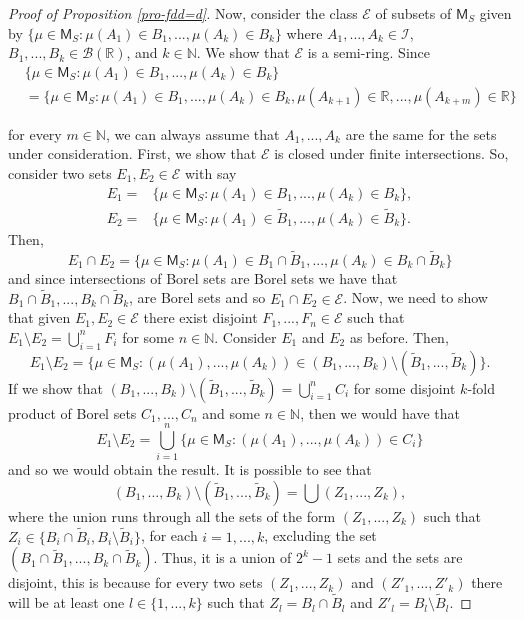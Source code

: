 \documentclass{article}
\theoremstyle{plain}
\theoremstyle{remark}
\begin{document}
\begin{proof}[Proof of Proposition \ref{pro-fdd=d}]
	Now, consider the class $\mathcal{E}$ of subsets of $\mathsf{M}_S$ given by $\{\mu\in\mathsf{M}_S:\mu(A_1)\in B_1,...,\mu(A_k)\in B_k\}$ where $A_1,...,A_k\in\mathcal{I}$, $B_1,...,B_k\in\mathcal{B}(\mathbb{R})$, and $k\in\mathbb{N}$. We show that $\mathcal{E}$ is a semi-ring. Since 
	\begin{align*}
		&\{\mu\in\mathsf{M}_S:\mu(A_1)\in B_1,...,\mu(A_k)\in B_k\}\\&	=\{\mu\in\mathsf{M}_S:\mu(A_1)\in B_1,...,\mu(A_k)\in B_k,\mu(A_{k+1})\in\mathbb{R},...,\mu(A_{k+m})\in\mathbb{R}\}
	\end{align*}
	
	for every $m\in\mathbb{N}$, we can always assume that $A_1,...,A_k$ are the same for the sets under consideration. First, we show that $\mathcal{E}$ is closed under finite intersections. So, consider two sets $E_1,E_2\in\mathcal{E}$ with say 
	\begin{align*}
		E_1=&\{\mu\in\mathsf{M}_S:\mu(A_1)\in B_1,...,\mu(A_k)\in B_k\},\\
		E_2=&\{\mu\in\mathsf{M}_S:\mu(A_1)\in \tilde{B}_1,...,\mu(A_k)\in \tilde{B}_k\}.
	\end{align*}
	Then, 
	\begin{equation*}
		E_1\cap E_2=\{\mu\in\mathsf{M}_S:\mu(A_1)\in B_1\cap\tilde{B}_1,...,\mu(A_k)\in B_k\cap\tilde{B}_k\}
	\end{equation*}
	and since intersections of Borel sets are Borel sets we have that $B_1\cap\tilde{B}_1,...,B_k\cap\tilde{B}_k$, are Borel sets and so $E_1\cap E_2\in\mathcal{E}$. Now, we need to show that given $E_1,E_2\in\mathcal{E}$ there exist disjoint $F_1,...,F_n\in\mathcal{E}$ such that $E_1\setminus E_2=\bigcup_{i=1}^n F_i$ for some $n\in\mathbb{N}$. Consider $E_1$ and $E_2$ as before. Then, 
	\begin{equation*}
		E_1\setminus E_2=\{\mu\in\mathsf{M}_S:(\mu(A_1),...,\mu(A_k))\in (B_1,...,B_k)\setminus(\tilde{B}_1,...,\tilde{B}_k)\}.
	\end{equation*}
	If we show that $		(B_1,...,B_k)\setminus(\tilde{B}_1,...,\tilde{B}_k)=\bigcup_{i=1}^n C_i$ for some disjoint $k$-fold product of Borel sets $C_1,...,C_n$ and some $n\in\mathbb{N}$, then we would have that
	\begin{equation*}
		E_1\setminus E_2=\bigcup_{i=1}^n\{\mu\in\mathsf{M}_S:(\mu(A_1),...,\mu(A_k))\in C_i\}
	\end{equation*}
	and so we would obtain the result. It is possible to see that 
	\begin{equation*}
		(B_1,...,B_k)\setminus(\tilde{B}_1,...,\tilde{B}_k)=\bigcup(Z_1,...,Z_k),
	\end{equation*}
	where the union runs through all the sets of the form $(Z_1,...,Z_k)$ such that $Z_i\in\{B_i\cap\tilde{B}_i,B_i\setminus\tilde{B}_i\}$, for each $i=1,...,k$, excluding the set $(B_1\cap\tilde{B}_1,...,B_k\cap\tilde{B}_k)$. Thus, it is a union of $2^{k}-1$ sets and the sets are disjoint, this is because for every two sets $(Z_1,...,Z_k)$ and $(Z'_1,...,Z'_k)$ there will be at least one $l\in\{1,...,k\}$ such that $Z_l=B_l\cap\tilde{B}_l$ and $Z'_l=B_l\setminus\tilde{B}_l$.
	

\end{proof}
\end{document}
